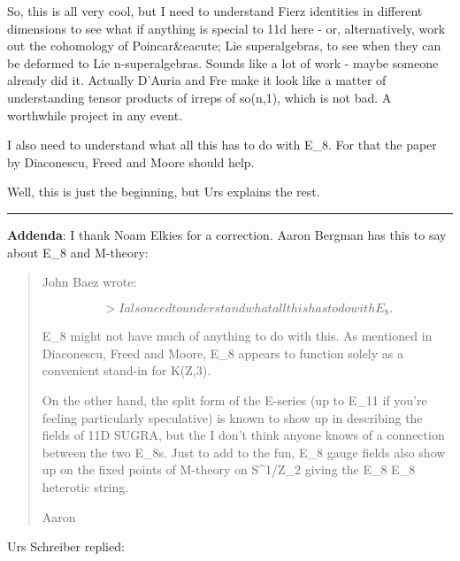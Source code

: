 So, this is all very cool, but I need to understand Fierz identities
in different dimensions to see what if anything is special to
11d here - or, alternatively, work out the cohomology of Poincar&eacute;
Lie superalgebras, to see when they can be deformed to Lie 
n-superalgebras.  Sounds like a lot of work - maybe someone already
did it.  Actually D'Auria and Fre make it look like a matter of
understanding tensor products of irreps of so(n,1), which is not bad.
A worthwhile project in any event.

I also need to understand what all this has to do with E_{8}.
For that the paper by Diaconescu, Freed and Moore should help.

Well, this is just the beginning, but Urs explains the rest.

\par\noindent\rule{\textwidth}{0.4pt}
\textbf{Addenda}: I thank Noam Elkies for a correction.  Aaron
Bergman has this to say about E_{8} and M-theory:

\begin{quote}
John Baez wrote:


$$

> I also need to understand what all this has to do with E_{8}.
$$
    

E_{8} might not have much of anything to do with this. As mentioned in
Diaconescu, Freed and Moore, E_{8} appears to function solely as a
convenient stand-in for K(Z,3).

On the other hand, the split form of the E-series (up to
E_{11} if you're feeling particularly speculative) is known to
show up in describing the fields of 11D SUGRA, but the I don't think
anyone knows of a connection between the two E_{8}s. Just to
add to the fun, E_{8} gauge fields also show up on the fixed
points of M-theory on S^{1}/Z_{2} giving the
E_{8} \times  E_{8} heterotic string. 

Aaron
\end{quote}

Urs Schreiber replied:

